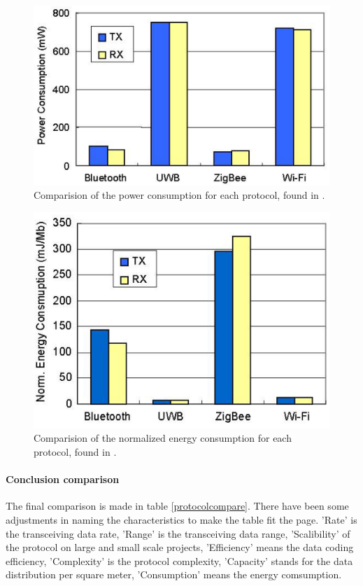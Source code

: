 \documentclass[10pt,a4paper]{article}
\begin{document}
\begin{figure}[H]
   \centering
   \includegraphics[width=1\textwidth]{images/protocolenergy.png}
   \caption{Comparision of the power consumption for each protocol, found in \cite{comparitivestudywirelessprotocols}.}
   \label{fig:protocolenergy}
\end{figure}

\begin{figure}[H]
   \centering
   \includegraphics[width=1\textwidth]{images/protocolenergynormalized.png}
   \caption{Comparision of the normalized energy consumption for each protocol, found in \cite{comparitivestudywirelessprotocols}.}
   \label{fig:protocolenergynormalized}
\end{figure}


\paragraph{Conclusion comparison}
The final comparison is made in table \ref{protocolcompare}. There have been some adjustments in naming the characteristics to make the table fit the page. 'Rate' is the transceiving data rate, 'Range' is the transceiving data range, 'Scalibility' of the protocol on large and small scale projects, 'Efficiency' means the data coding efficiency, 'Complexity' is the protocol complexity, 'Capacity' stands for the data distribution per square meter, 'Consumption' means the energy comsumption.
\end{document}
